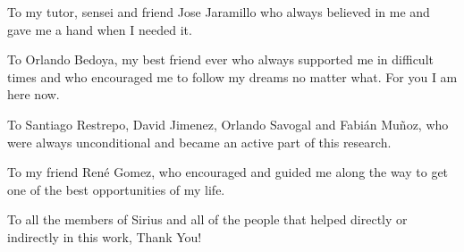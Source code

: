 \begin{dedication}
To my tutor, sensei and friend Jose Jaramillo who always believed in me and gave me a hand when I needed it.
\end{dedication}

\begin{dedication}
To Orlando Bedoya, my best friend ever who always supported me in difficult times 
and who encouraged me to follow my dreams no matter what. For you I am here now.
\end{dedication}

\begin{dedication}
To Santiago Restrepo, David Jimenez, Orlando Savogal and Fabián Muñoz, 
who were always unconditional and became an active part of this research.
\end{dedication}

\begin{dedication}
To my friend René Gomez, who encouraged and guided me along the way to 
get one of the best opportunities of my life.
\end{dedication}

\begin{dedication}
To all the members of Sirius and all of the people that helped directly or 
indirectly in this work, Thank You!
\end{dedication}
